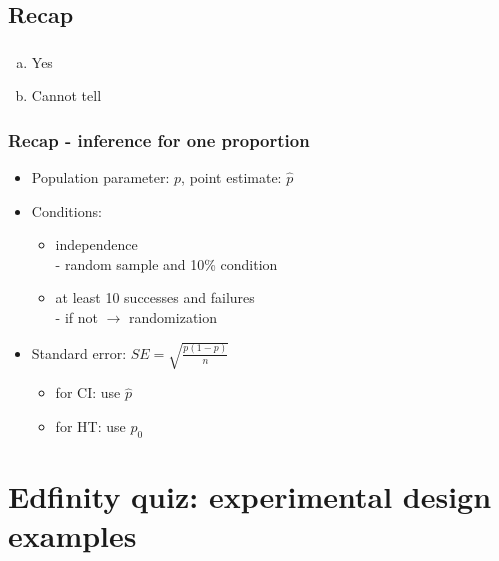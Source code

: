 \documentclass[slidestop,compress,mathserif]{beamer}
\begin{document}

\subsection{Recap}


\begin{frame}
\frametitle{}


\begin{enumerate}[(a)]
\item Yes
\item Cannot tell
\end{enumerate}

\end{frame}


\begin{frame}
\frametitle{Recap - inference for one proportion}

\begin{itemize}

\item Population parameter: $p$, point estimate: $\hat{p}$

\pause

\item Conditions:
\begin{itemize}
\item independence \\
- random sample and 10\% condition
\item at least 10 successes and failures\\ - if not $\rightarrow$ randomization
\end{itemize}

\pause

\item Standard error: $SE = \sqrt{ \frac{p(1-p)}{n} }$
\begin{itemize}
\item for CI: use $\hat{p}$
\item for HT: use $p_0$
\end{itemize}

\end{itemize}

\end{frame}


\section{Edfinity quiz: experimental design examples}  %

\end{document}
